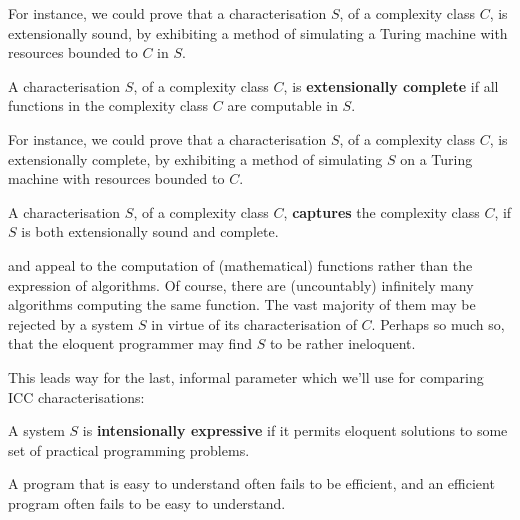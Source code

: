 For instance, we could prove that a characterisation $S$, of a complexity class
$C$, is extensionally sound, by exhibiting a method of simulating a Turing
machine with resources bounded to $C$ in $S$.

\begin{definition} \label{def:icc-completeness} A characterisation $S$, of a
complexity class $C$, is \textbf{extensionally complete} if all functions in
the complexity class $C$ are computable in $S$.\end{definition}

For instance, we could prove that a characterisation $S$, of a complexity class
$C$, is extensionally complete, by exhibiting a method of simulating $S$ on a
Turing machine with resources bounded to $C$.

\begin{definition} \label{def:icc-capture} A characterisation $S$, of a
complexity class $C$, \textbf{captures} the complexity class $C$, if $S$ is
both extensionally sound and complete.  \end{definition}

 and  appeal to the computation
of (mathematical) functions rather than the expression of algorithms. Of
course, there are (uncountably) infinitely many algorithms computing the same
function. The vast majority of them may be rejected by a system $S$ in virtue
of its characterisation of $C$. Perhaps so much so, that the eloquent
programmer may find $S$ to be rather ineloquent.


This leads way for the last, informal parameter which we'll use for comparing
ICC characterisations:


\begin{notion} A system $S$ is \textbf{intensionally expressive} if it permits
eloquent solutions to some set of practical programming problems.\end{notion}


A program that is easy to understand often fails to be efficient, and an
efficient program often fails to be easy to understand.

